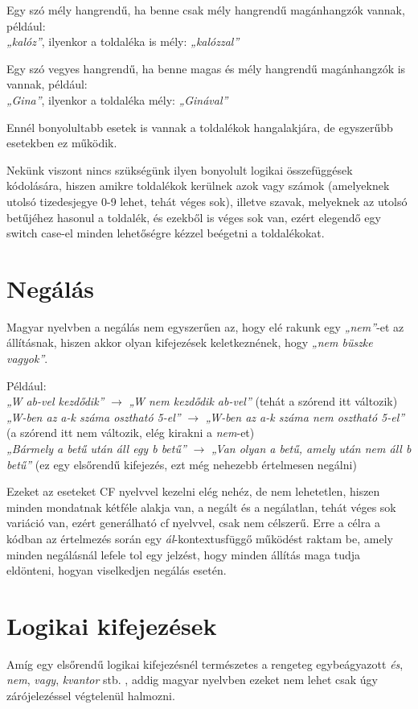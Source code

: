 \documentclass[12pt]{report}
\theoremstyle{definition}
\begin{document}
Egy szó mély hangrendű, ha benne csak mély hangrendű magánhangzók vannak, például:\\ \textit{„kalóz”}, ilyenkor a toldaléka is mély: \textit{„kalózzal”}

Egy szó vegyes hangrendű, ha benne magas és mély hangrendű magánhangzók is vannak, például:\\
\textit{„Gina”}, ilyenkor a toldaléka mély: \textit{„Ginával”}

Ennél bonyolultabb esetek is vannak a toldalékok hangalakjára, de egyszerűbb esetekben ez működik.

Nekünk viszont nincs szükségünk ilyen bonyolult logikai összefüggések kódolására, hiszen amikre toldalékok kerülnek azok vagy számok (amelyeknek utolsó tizedesjegye 0-9 lehet, tehát véges sok), illetve szavak, melyeknek az utolsó betűjéhez hasonul a toldalék, és ezekből is véges sok van, ezért elegendő egy switch case-el minden lehetőségre kézzel beégetni a toldalékokat.

\section{Negálás}
Magyar nyelvben a negálás nem egyszerűen az, hogy elé rakunk egy \textit{„nem”}-et az állításnak, hiszen akkor olyan kifejezések keletkeznének, hogy \textit{„nem büszke vagyok”}.

Például:\\
\textit{„W ab-vel kezdődik”} $\rightarrow$ \textit{„W nem kezdődik ab-vel”} (tehát a szórend itt változik)\\
\textit{„W-ben az a-k száma osztható 5-el”} $\rightarrow$ \textit{„W-ben az a-k száma nem osztható 5-el”} (a szórend itt nem változik, elég kirakni a \textit{nem}-et)\\
\textit{„Bármely a betű után áll egy b betű”} $\rightarrow$ \textit{„Van olyan a betű, amely után nem áll b betű”} (ez egy elsőrendű kifejezés, ezt még nehezebb értelmesen negálni)

Ezeket az eseteket CF nyelvvel kezelni elég nehéz, de nem lehetetlen, hiszen minden mondatnak kétféle alakja van, a negált és a negálatlan, tehát véges sok variáció van, ezért generálható cf nyelvvel, csak nem célszerű. Erre a célra a kódban az értelmezés során egy \textit{ál}-kontextusfüggő működést raktam be, amely minden negálásnál lefele tol egy jelzést, hogy minden állítás maga tudja eldönteni, hogyan viselkedjen negálás esetén.

\section{Logikai kifejezések}
Amíg egy elsőrendű logikai kifejezésnél természetes a rengeteg egybeágyazott \textit{és}, \textit{nem}, \textit{vagy}, \textit{kvantor} stb. , addig magyar nyelvben ezeket nem lehet csak úgy zárójelezéssel végtelenül halmozni.
\end{document}

